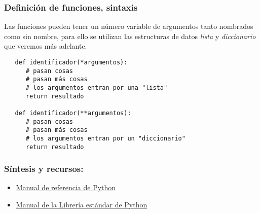 \documentclass{beamer}
\begin{document}

\begin{frame}[fragile]
   \frametitle{Definición de funciones, sintaxis}
   Las funciones pueden tener un número variable de argumentos tanto nombrados como sin nombre, para ello se utilizan las estructuras de datos {\em lista} y {\em diccionario} que veremos más adelante.
   \begin{block}{}
   \begin{verbatim}
   def identificador(*argumentos):
      # pasan cosas
      # pasan más cosas
      # los argumentos entran por una "lista"
      return resultado 
    
   def identificador(**argumentos):
      # pasan cosas
      # pasan más cosas
      # los argumentos entran por un "diccionario"
      return resultado   
   \end{verbatim}
   \end{block}
   \end{frame}

\begin{frame}
\frametitle{Síntesis y recursos:}

\begin{itemize}
\item \href{https://docs.python.org/3/reference/index.html}{Manual de referencia de Python}
\item \href{https://docs.python.org/3/library/index.html}{Manual de la Librería estándar de Python}
\end{itemize}
\end{frame}
\end{document}
